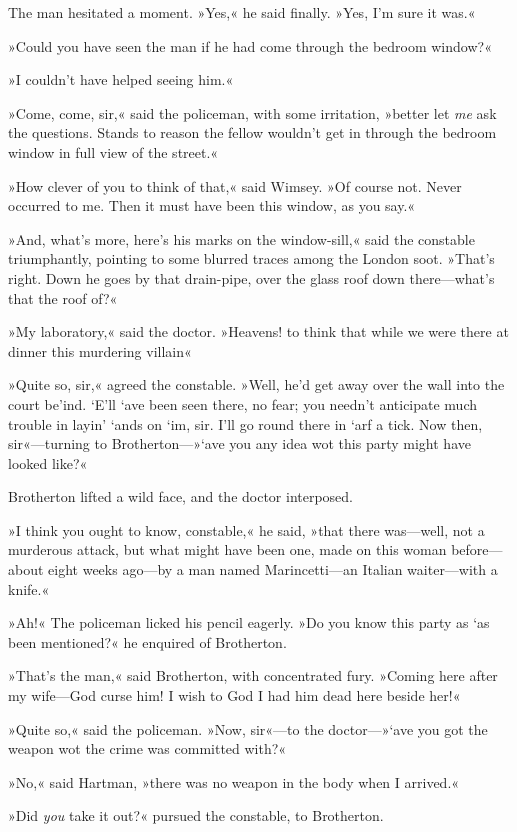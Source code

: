 The man hesitated a moment. »Yes,« he said finally. »Yes, I'm sure it was.«

»Could you have seen the man if he had come through the bedroom window?«

»I couldn't have helped seeing him.«

»Come, come, sir,« said the policeman, with some irritation, »better let \textit{me} ask the questions. Stands to reason the fellow wouldn't get in through the bedroom window in full view of the street.«

»How clever of you to think of that,« said Wimsey. »Of course not. Never occurred to me. Then it must have been this window, as you say.«

»And, what's more, here's his marks on the window-sill,« said the constable triumphantly, pointing to some blurred traces among the London soot. »That's right. Down he goes by that drain-pipe, over the glass roof down there—what's that the roof of?«

»My laboratory,« said the doctor. »Heavens! to think that while we were there at dinner this murdering villain\longdash«

»Quite so, sir,« agreed the constable. »Well, he'd get away over the wall into the court be'ind. `E'll `ave been seen there, no fear; you needn't anticipate much trouble in layin' `ands on `im, sir. I'll go round there in `arf a tick. Now then, sir«—turning to Brotherton—»`ave you any idea wot this party might have looked like?«

Brotherton lifted a wild face, and the doctor interposed.

»I think you ought to know, constable,« he said, »that there was—well, not a murderous attack, but what might have been one, made on this woman before—about eight weeks ago—by a man named Marincetti—an Italian waiter—with a knife.«

»Ah!« The policeman licked his pencil eagerly. »Do you know this party as `as been mentioned?« he enquired of Brotherton.

»That's the man,« said Brotherton, with concentrated fury. »Coming here after my wife—God curse him! I wish to God I had him dead here beside her!«

»Quite so,« said the policeman. »Now, sir«—to the doctor—»`ave you got the weapon wot the crime was committed with?«

»No,« said Hartman, »there was no weapon in the body when I arrived.«

»Did \textit{you} take it out?« pursued the constable, to Brotherton.

